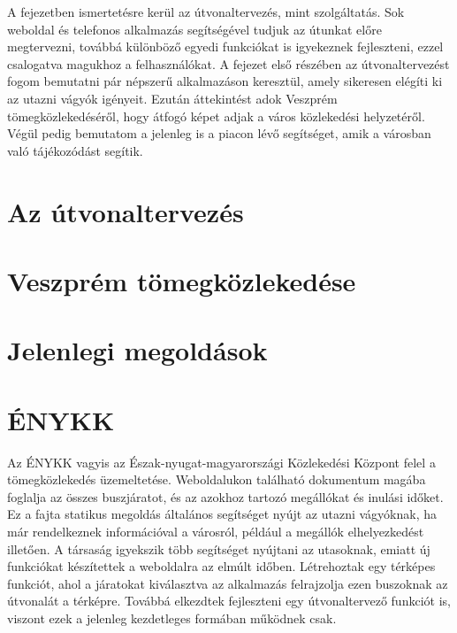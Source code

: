
A fejezetben ismertetésre kerül az útvonaltervezés, mint szolgáltatás. 
Sok weboldal és telefonos alkalmazás segítségével tudjuk az útunkat előre megtervezni, továbbá különböző egyedi funkciókat is igyekeznek fejleszteni, ezzel csalogatva magukhoz a felhasználókat. 
A fejezet első részében az útvonaltervezést fogom bemutatni pár népszerű alkalmazáson keresztül, amely sikeresen elégíti ki az utazni vágyók igényeit. 
Ezután áttekintést adok Veszprém tömegközlekedéséről, hogy átfogó képet adjak a város közlekedési helyzetéről. 
Végül pedig bemutatom a jelenleg is a piacon lévő segítséget, amik a városban való tájékozódást segítik. 


\section{Az útvonaltervezés}
\label{utvonalterv}




\section{Veszprém tömegközlekedése}
\label{veszpremtomeg}



\section{Jelenlegi megoldások}
\label{megoldasok}




\section*{ÉNYKK}
\label{enykk}

Az ÉNYKK vagyis az Észak-nyugat-magyarországi Közlekedési Központ felel a tömegközlekedés üzemeltetése. 
Weboldalukon található dokumentum magába foglalja az összes buszjáratot, és az azokhoz tartozó megállókat és inulási időket. 
Ez a fajta statikus megoldás általános segítséget nyújt az utazni vágyóknak, ha már rendelkeznek információval a városról, például a megállók elhelyezkedést illetően. 
A társaság igyekszik több segítséget nyújtani az utasoknak, emiatt új funkciókat készítettek a weboldalra az elmúlt időben. 
Létrehoztak egy térképes funkciót, ahol a járatokat kiválasztva az alkalmazás felrajzolja ezen buszoknak az útvonalát a térképre. 
Továbbá elkezdtek fejleszteni egy útvonaltervező funkciót is, viszont ezek a jelenleg kezdetleges formában működnek csak. 




